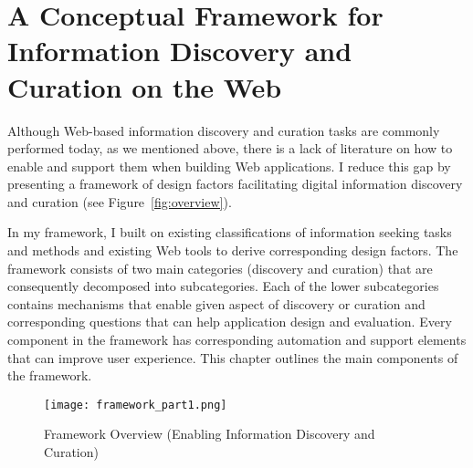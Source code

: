 \chapter{A Conceptual Framework for Information Discovery and Curation on the Web}
\label{chapter:framework}

Although Web-based information discovery and curation tasks are commonly performed today, as we mentioned above, there is a lack of literature on how to enable and support them when building Web applications. I reduce this gap by presenting a framework of design factors facilitating digital information discovery and curation (see Figure~\ref{fig:overview}). 

In my framework, I built on existing classifications of information seeking tasks and methods and existing Web tools to derive corresponding design factors. The framework consists of two main categories (discovery and curation) that are consequently decomposed into subcategories. Each of the lower subcategories contains mechanisms that enable given aspect of discovery or curation and corresponding questions that can help application design and evaluation. Every component in the framework has corresponding automation and support elements that can improve user experience. This chapter outlines the main components of the framework. 

\begin{figure}[ht!]
	\noindent
	\centering
	\texttt{[image: framework\_part1.png]}
	\caption{Framework Overview (Enabling Information Discovery and Curation)}
	\label{fig:framework_part1} 
\end{figure}

